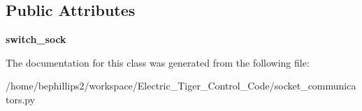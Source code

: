 \subsection*{Public Attributes}
\begin{DoxyCompactItemize}
\item 
\hypertarget{classsocket__communicators_1_1_switch_comm_abb27aeffc55e1381d52fe8f22d1d41fb}{{\bfseries switch\-\_\-sock}}\label{classsocket__communicators_1_1_switch_comm_abb27aeffc55e1381d52fe8f22d1d41fb}

\end{DoxyCompactItemize}


The documentation for this class was generated from the following file\-:\begin{DoxyCompactItemize}
\item 
/home/bephillips2/workspace/\-Electric\-\_\-\-Tiger\-\_\-\-Control\-\_\-\-Code/socket\-\_\-communicators.\-py\end{DoxyCompactItemize}
